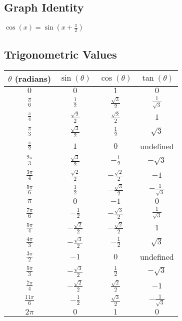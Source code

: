 \subsection{Graph Identity}
\(\cos(x) = \sin(x + \frac{\pi}{2})\)

\subsection{Trigonometric Values}
\smallskip
\begin{center}
    \renewcommand{\arraystretch}{1.4}
    \begin{tabular}{|c|c|c|c|}
    \hline
    $\theta$ (radians) & $\sin(\theta)$ & $\cos(\theta)$ & $\tan(\theta)$ \\
    \hline
    $0$ & $0$ & $1$ & $0$ \\
    \hline
    $\frac{\pi}{6}$ & $\frac{1}{2}$ & $\frac{\sqrt{3}}{2}$ & $\frac{1}{\sqrt{3}}$ \\
    \hline
    $\frac{\pi}{4}$ & $\frac{\sqrt{2}}{2}$ & $\frac{\sqrt{2}}{2}$ & $1$ \\
    \hline
    $\frac{\pi}{3}$ & $\frac{\sqrt{3}}{2}$ & $\frac{1}{2}$ & $\sqrt{3}$ \\
    \hline
    $\frac{\pi}{2}$ & $1$ & $0$ & undefined \\
    \hline
    $\frac{2\pi}{3}$ & $\frac{\sqrt{3}}{2}$ & $-\frac{1}{2}$ & $-\sqrt{3}$ \\
    \hline
    $\frac{3\pi}{4}$ & $\frac{\sqrt{2}}{2}$ & $-\frac{\sqrt{2}}{2}$ & $-1$ \\
    \hline
    $\frac{5\pi}{6}$ & $\frac{1}{2}$ & $-\frac{\sqrt{3}}{2}$ & $-\frac{1}{\sqrt{3}}$ \\
    \hline
    $\pi$ & $0$ & $-1$ & $0$ \\
    \hline
    $\frac{7\pi}{6}$ & $-\frac{1}{2}$ & $-\frac{\sqrt{3}}{2}$ & $\frac{1}{\sqrt{3}}$ \\
    \hline
    $\frac{5\pi}{4}$ & $-\frac{\sqrt{2}}{2}$ & $-\frac{\sqrt{2}}{2}$ & $1$ \\
    \hline
    $\frac{4\pi}{3}$ & $-\frac{\sqrt{3}}{2}$ & $-\frac{1}{2}$ & $\sqrt{3}$ \\
    \hline
    $\frac{3\pi}{2}$ & $-1$ & $0$ & undefined \\
    \hline
    $\frac{5\pi}{3}$ & $-\frac{\sqrt{3}}{2}$ & $\frac{1}{2}$ & $-\sqrt{3}$ \\
    \hline
    $\frac{7\pi}{4}$ & $-\frac{\sqrt{2}}{2}$ & $\frac{\sqrt{2}}{2}$ & $-1$ \\
    \hline
    $\frac{11\pi}{6}$ & $-\frac{1}{2}$ & $\frac{\sqrt{3}}{2}$ & $-\frac{1}{\sqrt{3}}$ \\
    \hline
    $2\pi$ & $0$ & $1$ & $0$ \\
    \hline
    \end{tabular}
\end{center}

